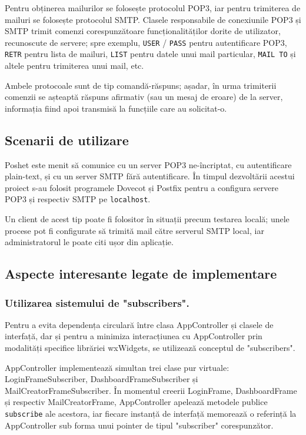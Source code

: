 \documentclass[runningheads]{llncs}
\begin{document}
Pentru obținerea mailurilor se folosește protocolul POP3\cite{ref_rfc_pop3}, iar pentru trimiterea de mailuri se folosește protocolul SMTP\cite{ref_rfc_smtp}. Clasele responsabile de conexiunile POP3 și SMTP trimit comenzi corespunzătoare funcționalităților dorite de utilizator, recunoscute de servere; spre exemplu, \texttt{USER} / \texttt{PASS} pentru autentificare POP3, \texttt{RETR} pentru lista de mailuri, \texttt{LIST} pentru datele unui mail particular, \texttt{MAIL TO} și altele pentru trimiterea unui mail, etc.

Ambele protocoale sunt de tip comandă-răspuns; așadar, în urma trimiterii comenzii se așteaptă răspuns afirmativ (sau un mesaj de eroare) de la server, informația fiind apoi transmisă la funcțiile care au solicitat-o.

\subsection{Scenarii de utilizare}
Poshet este menit să comunice cu un server POP3 ne-încriptat, cu autentificare plain-text, și cu un server SMTP fără autentificare. În timpul dezvoltării acestui proiect s-au folosit programele Dovecot și Postfix pentru a configura servere POP3 și respectiv SMTP pe \texttt{localhost}.

Un client de acest tip poate fi folositor în situații precum testarea locală; unele procese pot fi configurate să trimită mail către serverul SMTP local, iar administratorul le poate citi ușor din aplicație.

\subsection{Aspecte interesante legate de implementare}


\subsubsection{Utilizarea sistemului de "subscribers".} Pentru a evita dependența circulară între clasa AppController și clasele de interfață, dar și pentru a minimiza interacțiunea cu AppController prin modalități specifice librăriei wxWidgets, se utilizează conceptul de "subscribers".

AppController implementează simultan trei clase pur virtuale: LoginFrameSubscriber, DashboardFrameSubscriber și MailCreatorFrameSubscriber. În momentul creerii LoginFrame, DashboardFrame și respectiv MailCreatorFrame, AppController apelează metodele publice \texttt{subscribe} ale acestora, iar fiecare instanță de interfață memorează o referință la AppController sub forma unui pointer de tipul "subscriber" corespunzător.
\end{document}
